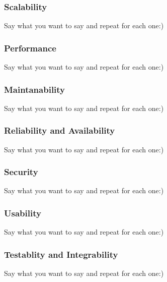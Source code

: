 
%

\subsubsection{Scalability}
\begin{flushleft}
Say what you want to say and repeat for each one:)

\end{flushleft}
		
\subsubsection{Performance}
\begin{flushleft}
Say what you want to say and repeat for each one:)

\end{flushleft}
		
\subsubsection{Maintanability}
\begin{flushleft}
Say what you want to say and repeat for each one:)

\end{flushleft}
		
\subsubsection{Reliability and Availability}	
\begin{flushleft}
Say what you want to say and repeat for each one:)

\end{flushleft}	
		
\subsubsection{Security}	
\begin{flushleft}
Say what you want to say and repeat for each one:)

\end{flushleft}	

\subsubsection{Usability}
\begin{flushleft}
Say what you want to say and repeat for each one:)

\end{flushleft}
		
\subsubsection{Testablity and Integrability}
\begin{flushleft}
Say what you want to say and repeat for each one:)

\end{flushleft}
		